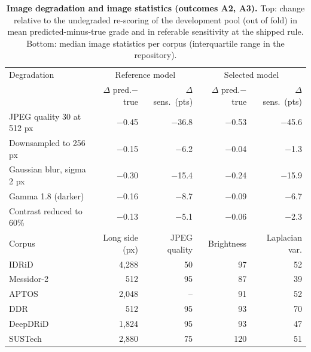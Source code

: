 \begin{table}[h]
\caption{\textbf{Image degradation and image statistics (outcomes A2, A3).} Top: change relative to the undegraded re-scoring of the development pool (out of fold) in mean predicted-minus-true grade and in referable sensitivity at the shipped rule. Bottom: median image statistics per corpus (interquartile range in the repository).}\label{tab:mechanism}
\centering\scriptsize
\begin{tabular}{@{}lrrrr@{}}
\toprule
Degradation & \multicolumn{2}{c}{Reference model} & \multicolumn{2}{c}{Selected model} \\
 & $\Delta$ pred.$-$true & $\Delta$ sens.\ (pts) & $\Delta$ pred.$-$true & $\Delta$ sens.\ (pts) \\
\midrule
JPEG quality 30 at 512 px & $-$0.45 & $-$36.8 & $-$0.53 & $-$45.6 \\
Downsampled to 256 px & $-$0.15 & $-$6.2 & $-$0.04 & $-$1.3 \\
Gaussian blur, sigma 2 px & $-$0.30 & $-$15.4 & $-$0.24 & $-$15.9 \\
Gamma 1.8 (darker) & $-$0.16 & $-$8.7 & $-$0.09 & $-$6.7 \\
Contrast reduced to 60\% & $-$0.13 & $-$5.1 & $-$0.06 & $-$2.3 \\
\midrule
Corpus & Long side (px) & JPEG quality & Brightness & Laplacian var. \\
\midrule
IDRiD & 4,288 & 50 & 97 & 52 \\
Messidor-2 & 512 & 95 & 87 & 39 \\
APTOS & 2,048 & -- & 91 & 52 \\
DDR & 512 & 95 & 93 & 70 \\
DeepDRiD & 1,824 & 95 & 93 & 47 \\
SUSTech & 2,880 & 75 & 120 & 51 \\
\bottomrule
\end{tabular}
\end{table}
